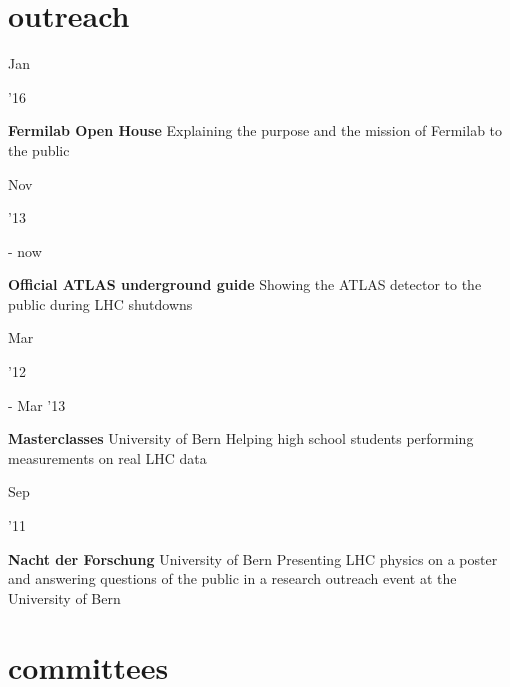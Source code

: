 \documentclass[]{cv} %
\begin{document}
\section{outreach}

\begin{entrylist}

  \entry
  {\parbox[t]{\parboxWidthOne}{Jan}\parbox[t]{\parboxWidthTwo}{\hfill '16}}
  {\textbf{Fermilab Open House}}
  {}
  {Explaining the purpose and the mission of Fermilab to the public}

  \entry
  {\parbox[t]{\parboxWidthOne}{Nov}\parbox[t]{\parboxWidthTwo}{\hfill '13} - now}
  {\textbf{Official ATLAS underground guide}}
  {}
  {Showing the ATLAS detector to the public during LHC shutdowns}

  \entry
  {\parbox[t]{\parboxWidthOne}{Mar}\parbox[t]{\parboxWidthTwo}{\hfill '12} - Mar
'13}
  {\textbf{Masterclasses}}
  {University of Bern}
  {Helping high school students performing measurements on real LHC data}

  \entry
  {\parbox[t]{\parboxWidthOne}{Sep}\parbox[t]{\parboxWidthTwo}{\hfill '11}}
  {\textbf{Nacht der Forschung}}
  {University of Bern}
  {Presenting LHC physics on a poster and answering questions of the public in a
  research outreach event at the University of Bern}

\end{entrylist}

\newpage

\section{committees}
\end{document}
